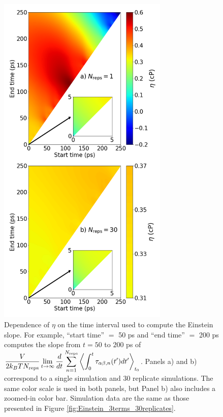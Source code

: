 \documentclass[9pt,bestpractices]{livecoms}
\begin{document}
\begin{figure}[htb!]
	\centering
	\includegraphics[width=3.2in]{Einstein_slope_time_interval.png}
	\caption{Dependence of $\eta$ on the time interval used to compute the Einstein slope. For example, ``start time'' $=$ 50 ps and ``end time'' $=$ 200 ps computes the slope from $t = 50$ to $200$ ps of $\displaystyle \frac{V}{2 k_B T N_{\rm reps}} \lim_{t\to\infty} \frac{d}{dt} \sum_{n=1}^{N_{\rm reps}} \left\langle \int_0^t \tau_{\alpha\beta,n}(t') dt' \right\rangle_{t_0}$. Panels a) and b) correspond to a single simulation and 30 replicate simulations. The same color scale is used in both panels, but Panel b) also includes a zoomed-in color bar. Simulation data are the same as those presented in Figure \ref{fig:Einstein_3terms_30replicates}.}
	\label{fig:Einstein_slope_time_interval}
\end{figure}

\end{document}
